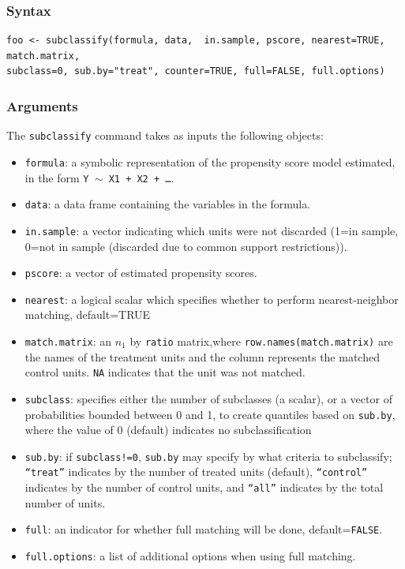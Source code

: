 \documentclass[oneside,letterpaper,titlepage]{article}
\begin{document}
\begin{appendix}
\subsubsection{Syntax}
\begin{verbatim}
foo <- subclassify(formula, data,  in.sample, pscore, nearest=TRUE, match.matrix,
subclass=0, sub.by="treat", counter=TRUE, full=FALSE, full.options)
\end{verbatim} 

\subsubsection{Arguments}
The \texttt{subclassify} command takes as inputs the following
objects:
\begin{itemize}
\item \texttt{formula}: a symbolic representation of the propensity score
  model estimated, in the form {\tt Y $\sim$ X1 + X2 + \dots}.
\item \texttt{data}: a data frame containing the variables in the formula.
\item \texttt{in.sample}: a vector indicating which units were not discarded
  (1=in sample, 0=not in sample (discarded due to common support
  restrictions)).
\item \texttt{pscore}: a vector of estimated propensity scores.  
\item \texttt{nearest}: a logical scalar which specifies whether
  to perform nearest-neighbor matching, default=TRUE 
\item \texttt{match.matrix}: an $n_1$ by \texttt{ratio} matrix,where
  \texttt{row.names(match.matrix)} are the names of the
  treatment units and the column represents the matched control units.
  \texttt{NA} indicates that the unit was not matched.
\item \texttt{subclass}: specifies either the number of subclasses (a
  scalar), or a vector of probabilities bounded between 0 and 1, to
  create quantiles based on \texttt{sub.by}, where the value of 0
  (default) indicates no subclassification
\item \texttt{sub.by}: if \texttt{subclass!=0}, \texttt{sub.by} may specify by
  what criteria to subclassify; {\tt ``treat''} indicates by the
  number of treated units (default), {\tt ``control''} indicates by
  the number of control units, and {\tt ``all''} indicates by the
  total number of units.
\item \texttt{full}: an indicator for whether full matching will be done, default={\texttt{FALSE}}.
\item \texttt{full.options}: a list of additional options when using full matching.
\end{itemize}


\end{appendix}
\end{document}
